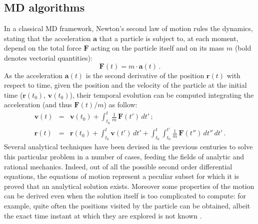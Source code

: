 \subsection{MD algorithms}
In a classical MD framework, Newton's second law of motion rules the dynamics, stating that the acceleration $\textbf{a}$ that a particle is subject to, at each moment, depend on the total force $\textbf{F}$ acting on the particle itself and on its mass $m$ (bold denotes vectorial quantities):
\begin{equation}
\textbf{F}(t) =  m \cdot \textbf{a}(t) \, .
\end{equation}
As the acceleration $\textbf{a}(t)$ is the second derivative of the position $\textbf{r}(t)$ with respect to time, given the position and the velocity of the particle at the initial time ($\textbf{r}(t_0)$, $\textbf{v}(t_0)$), their temporal evolution can be computed integrating the acceleration (and thus $\textbf{F}(t)/m$) as follow:
\begin{eqnarray} \label{eq:analytical}
\mathbf{v}(t) &=& \mathbf{v}(t_0) + \int_{t_0}^t \frac{1}{m}\,\mathbf{F}(t') \, dt' \, ; \\
\mathbf{r}(t) &=& \mathbf{r}(t_0) + \int_{t_0}^t \mathbf{v}(t') \, dt' + \int_{t_0}^t \int_{t_0}^{t'} \frac{1}{m}\,\mathbf{F}(t'') \, dt'' \, dt'\, .
\end{eqnarray}
Several analytical techniques have been devised in the previous centuries to solve this particular problem in a number of cases, feeding the fields of analytic and rational mechanics. Indeed, out of all the possible second order differential equations, the equations of motion represent a peculiar subset for which it is proved that an analytical solution exists. Moreover some properties of the motion can be derived even when the solution itself is too complicated to compute: for example, quite often the positions visited by the particle can be obtained, albeit the exact time instant at which they are explored is not known \cite{Arnold1989}.


